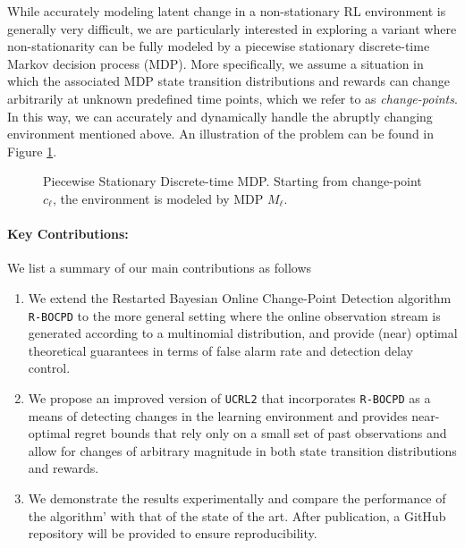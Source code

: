 \documentclass{article} %
\begin{document}
While accurately modeling latent change in a non-stationary RL environment is generally very difficult, we are particularly interested in exploring a variant where non-stationarity can be fully modeled by a piecewise stationary discrete-time Markov decision process (MDP). More specifically, we assume a situation in which the associated MDP state transition distributions and rewards can change arbitrarily at unknown predefined time points, which we refer to as \textit{change-points}. In this way, we can accurately and dynamically handle the abruptly changing environment mentioned above. An illustration of the problem can be found in Figure \ref{fig:NSMDP}.
\begin{center}
\begin{figure}[H]
    \centering
    \hspace*{-.75cm}
    \scalebox{1}{}
    \vspace{-1.7cm}
    \caption{Piecewise Stationary Discrete-time MDP. Starting from change-point $c_\ell$, the environment is modeled by MDP $M_\ell$.}
    \label{fig:NSMDP}
\end{figure}
\end{center}

\vspace{-1.4cm}
\paragraph{Key Contributions:} We list a summary of our main contributions as follows
\begin{enumerate}
    \item We extend the Restarted Bayesian Online Change-Point Detection algorithm \texttt{R-BOCPD} to the more general setting where the online observation stream is generated according to a multinomial distribution, and provide (near) optimal theoretical guarantees in terms of false alarm rate and detection delay control. 
    \item We propose an improved version of \texttt{UCRL2} that incorporates \texttt{R-BOCPD} as a means of detecting changes in the learning environment and provides near-optimal regret bounds that rely only on a small set of past observations and allow for changes of arbitrary magnitude in both state transition distributions and rewards. 
    \item We demonstrate the results experimentally and compare the performance of the algorithm' with that of the state of the art. After publication, a GitHub repository will be provided to ensure reproducibility.
\end{enumerate}
\end{document}
